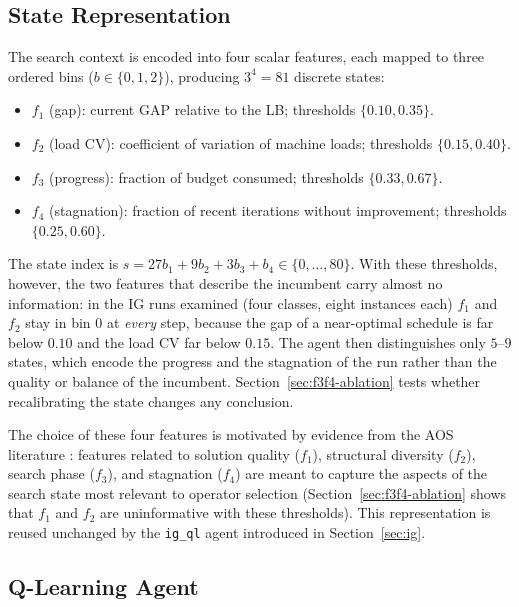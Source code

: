 \documentclass[final,3p,times,11pt,authoryear]{elsarticle}
\begin{document}
\subsection{State Representation}
\label{sec:state}

The search context is encoded into four scalar features, each mapped
to three ordered bins ($b \in \{0,1,2\}$), producing $3^4 = 81$
discrete states:

\begin{itemize}
  \item $f_1$ (gap): current GAP relative to the LB; thresholds
        $\{0.10, 0.35\}$.
  \item $f_2$ (load CV): coefficient of variation of machine loads;
        thresholds $\{0.15, 0.40\}$.
  \item $f_3$ (progress): fraction of budget consumed; thresholds
        $\{0.33, 0.67\}$.
  \item $f_4$ (stagnation): fraction of recent iterations without
        improvement; thresholds $\{0.25, 0.60\}$.
\end{itemize}

The state index is $s = 27b_1 + 9b_2 + 3b_3 + b_4 \in \{0,\ldots,80\}$.
With these thresholds, however, the two features that describe the
incumbent carry almost no information: in the IG runs examined (four
classes, eight instances each) $f_1$ and $f_2$ stay in bin 0 at
\emph{every} step, because the gap of a near-optimal schedule is far
below $0.10$ and the load CV far below $0.15$. The agent then
distinguishes only $5$--$9$ states, which encode the progress and the
stagnation of the run rather than the quality or balance of the
incumbent. Section~\ref{sec:f3f4-ablation} tests whether recalibrating
the state changes any conclusion.

The choice of these four features is motivated by evidence from the
AOS literature \citep{FialhoEtal2010}: features related to solution
quality ($f_1$), structural diversity ($f_2$), search phase ($f_3$),
and stagnation ($f_4$) are meant to capture the aspects of the search
state most relevant to operator selection (Section~\ref{sec:f3f4-ablation}
shows that $f_1$ and $f_2$ are uninformative with these thresholds).
This representation is reused unchanged by the \texttt{ig\_ql} agent
introduced in Section~\ref{sec:ig}.

\subsection{Q-Learning Agent}
\label{sec:qlm}
\end{document}
